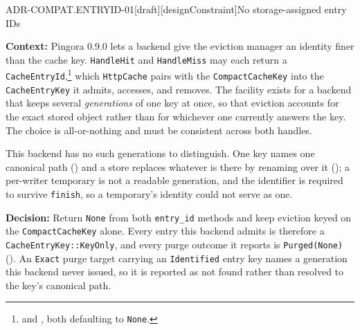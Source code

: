 \begin{requirement}{ADR-COMPAT.ENTRYID-01}[draft][designConstraint]{No storage-assigned entry IDs}


  \textbf{Context:} Pingora 0.9.0 lets a backend give the eviction manager an
  identity finer than the cache key. \texttt{HandleHit} and \texttt{HandleMiss}
  may each return a \texttt{CacheEntryId},\footnote{
  and ,
  both defaulting to \texttt{None}.} which \texttt{HttpCache} pairs with the
  \texttt{CompactCacheKey} into the \texttt{CacheEntryKey} it admits, accesses,
  and removes. The facility exists for a backend that keeps several
  \emph{generations} of one key at once, so that eviction accounts for the exact
  stored object rather than for whichever one currently answers the key. The
  choice is all-or-nothing and must be consistent across both handles.

  This backend has no such generations to distinguish. One key names one
  canonical path () and a store replaces whatever
  is there by renaming over it (); a per-writer
  temporary is not a readable generation, and the identifier is required to
  survive \texttt{finish}, so a temporary's identity could not serve as one.

  \textbf{Decision:} Return \texttt{None} from both \texttt{entry\_id} methods
  and keep eviction keyed on the \texttt{CompactCacheKey} alone. Every entry
  this backend admits is therefore a \texttt{CacheEntryKey::KeyOnly}, and every
  purge outcome it reports is \texttt{Purged(None)}
  (). An \texttt{Exact} purge target carrying an
  \texttt{Identified} entry key names a generation this backend never issued, so
  it is reported as not found rather than resolved to the key's canonical path.


\end{requirement}
